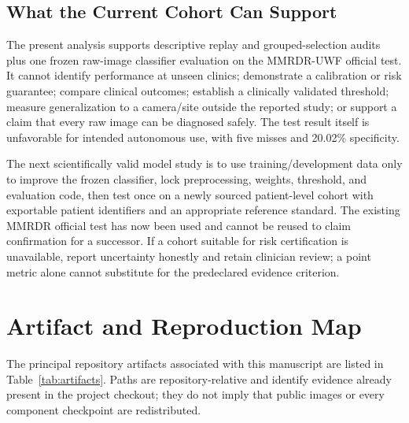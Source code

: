 \documentclass{ieeeaccess}
\begin{document}
\subsection{What the Current Cohort Can Support}
The present analysis supports descriptive replay and grouped-selection audits plus one frozen raw-image classifier evaluation on the MMRDR-UWF official test. It cannot identify performance at unseen clinics; demonstrate a calibration or risk guarantee; compare clinical outcomes; establish a clinically validated threshold; measure generalization to a camera/site outside the reported study; or support a claim that every raw image can be diagnosed safely. The test result itself is unfavorable for intended autonomous use, with five misses and 20.02\% specificity.

The next scientifically valid model study is to use training/development data only to improve the frozen classifier, lock preprocessing, weights, threshold, and evaluation code, then test once on a newly sourced patient-level cohort with exportable patient identifiers and an appropriate reference standard. The existing MMRDR official test has now been used and cannot be reused to claim confirmation for a successor. If a cohort suitable for risk certification is unavailable, report uncertainty honestly and retain clinician review; a point metric alone cannot substitute for the predeclared evidence criterion.

\section{Artifact and Reproduction Map}
The principal repository artifacts associated with this manuscript are listed in Table~\ref{tab:artifacts}. Paths are repository-relative and identify evidence already present in the project checkout; they do not imply that public images or every component checkpoint are redistributed.
\end{document}
